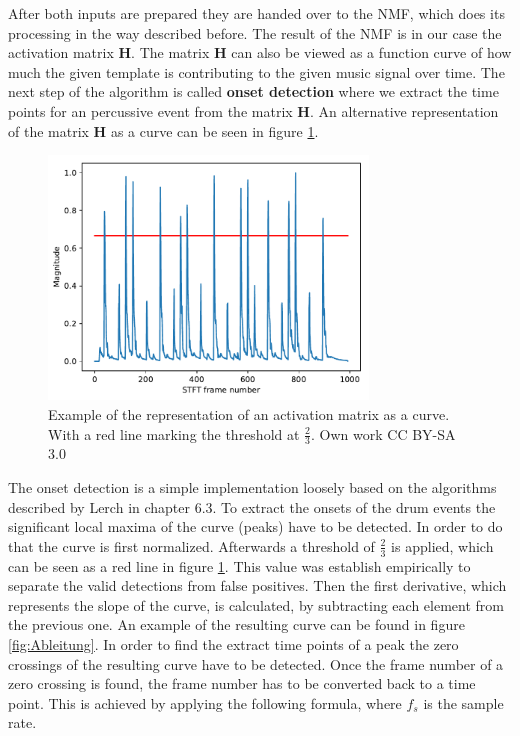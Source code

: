 \documentclass{article}
\begin{document}
After both inputs are prepared they are handed over to the NMF, which does its processing in the way described before.
The result of the NMF is in our case the activation matrix $\mathbf{H}$.
The matrix $\mathbf{H}$ can also be viewed as a function curve of how much the given template is contributing to the given music signal over time.
The next step of the algorithm is called \textbf{onset detection} where we extract the time points for an percussive event from the matrix $\mathbf{H}$.
An alternative representation of the matrix $\mathbf{H}$ as a curve can be seen in figure \ref{fig:ActivationMatrix}.
\begin{figure}[htb]

\begin{minipage}[b]{1.0\linewidth}
  \centering
  \centerline{\includegraphics[width=8.5cm]{figures/ActivationMatrix}}
  \medskip
\end{minipage}

\caption{Example of the representation of an activation matrix as a curve. With a red line marking the threshold at $\frac{2}{3}$. \scriptsize{\textsf{\textcopyright} Own work CC BY-SA 3.0}}
\label{fig:ActivationMatrix}

\end{figure}
The onset detection is a simple implementation loosely based on the algorithms described by Lerch \cite{lerch2012book} in chapter 6.3.
To extract the onsets of the drum events the significant local maxima of the curve (peaks) have to be detected.
In order to do that the curve is first normalized.
Afterwards a threshold of $\frac{2}{3}$ is applied, which can be seen as a red line in figure \ref{fig:ActivationMatrix}.
This value was establish empirically to separate the valid detections from false positives.
Then the first derivative, which represents the slope of the curve, is calculated, by subtracting each element from the previous one.
An example of the resulting curve can be found in figure \ref{fig:Ableitung}.
In order to find the extract time points of a peak the zero crossings of the resulting curve have to be detected.
Once the frame number of a zero crossing is found, the frame number has to be converted back to a time point.
This is achieved by applying the following formula, where $f_s$ is the sample rate.
\end{document}
